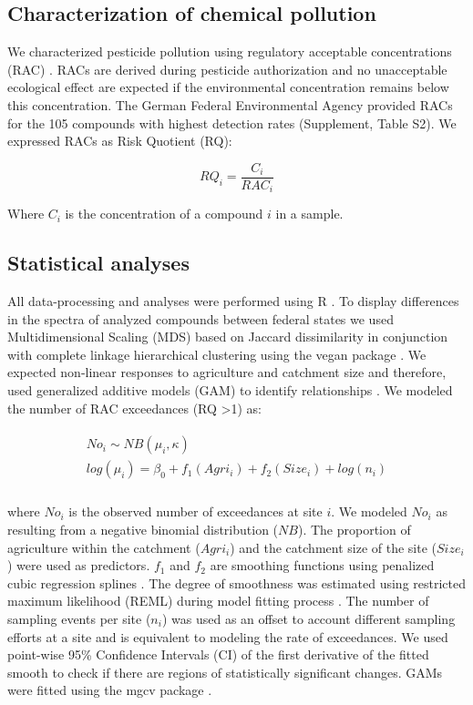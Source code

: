 \documentclass[journal=esthag,manuscript=article]{achemso}
\begin{document}
\subsection{Characterization of chemical pollution}
We characterized pesticide pollution using regulatory acceptable concentrations (RAC) \citep{brock_linking_2010}.
RACs are derived during pesticide authorization and no unacceptable ecological effect are expected if the environmental concentration remains below this concentration.
The German Federal Environmental Agency provided RACs for the 105 compounds with highest detection rates (Supplement, Table S2). 
We expressed RACs as Risk Quotient (RQ):

\begin{equation}
RQ_i = \frac{C_i}{RAC_i}
\end{equation}

Where $C_i$ is the concentration of a compound $i$ in a sample.

\subsection{Statistical analyses}
All data-processing and analyses were performed using R \citep{r_core_team_r:_2016}.
To display differences in the spectra of analyzed compounds between federal states we used Multidimensional Scaling (MDS) based on Jaccard dissimilarity in conjunction with complete linkage hierarchical clustering using the vegan package \citep{oksanen_vegan:_2016}.
We expected non-linear responses to agriculture and catchment size and therefore, used generalized additive models (GAM) to identify relationships \citep{fewster_analysis_2000}.
We modeled the number of RAC exceedances (RQ \textgreater 1) as:

\begin{align}
\begin{split}
  No_i \sim NB(\mu_i, \kappa) \\
  log(\mu_i)= \beta_0 + f_1(Agri_i) + f_2(Size_i) + log(n_i) \\
\end{split}
\end{align}

where $No_i$ is the observed number of exceedances at site $i$. 
We modeled $No_i$ as resulting from a negative binomial distribution ($NB$).
The proportion of agriculture within the catchment ($Agri_i$) and the catchment size of the site ($Size_i$) were used as predictors. 
$f_1$ and $f_2$ are smoothing functions using penalized cubic regression splines \citep{wood_generalized_2006}.
The degree of smoothness was estimated using restricted maximum likelihood (REML) during model fitting process \citep{wood_fast_2011}.
The number of sampling events per site ($n_i$) was used as an offset to account different sampling efforts at a site and is equivalent to modeling the rate of exceedances. 
We used point-wise 95\% Confidence Intervals (CI) of the first derivative of the fitted smooth to check if there are regions of statistically significant changes.
GAMs were fitted using the mgcv package \citep{wood_fast_2011}.
\end{document}
